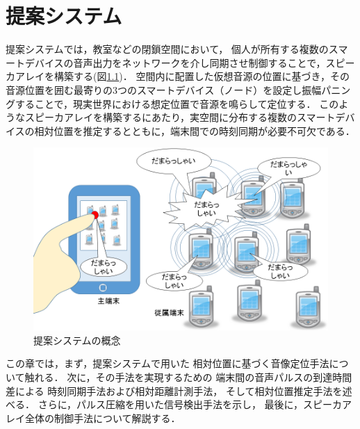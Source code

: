 
\chapter{提案システム}

提案システムでは，教室などの閉鎖空間において，
個人が所有する複数のスマートデバイスの音声出力をネットワークを介し同期させ制御することで，スピーカアレイを構築する(図\ref{fig:shikumi2})．
空間内に配置した仮想音源の位置に基づき，その音源位置を囲む最寄りの3つのスマートデバイス（ノード）を設定し振幅パニングすることで，現実世界における想定位置で音源を鳴らして定位する．
このようなスピーカアレイを構築するにあたり，実空間に分布する複数のスマートデバイスの相対位置を推定するとともに，端末間での時刻同期が必要不可欠である．

\begin{figure}[tb]\centering
  \hspace{-2mm}\includegraphics[clip,width=1.1\hsize]{img/shikumi3.png}
  \caption{提案システムの概念}\label{fig:shikumi2}
\end{figure}

この章では，まず，提案システムで用いた
相対位置に基づく音像定位手法について触れる．
次に，その手法を実現するための
端末間の音声パルスの到達時間差による
時刻同期手法および相対距離計測手法，
そして相対位置推定手法を述べる．
さらに，パルス圧縮を用いた信号検出手法を示し，
最後に，スピーカアレイ全体の制御手法について解説する．








